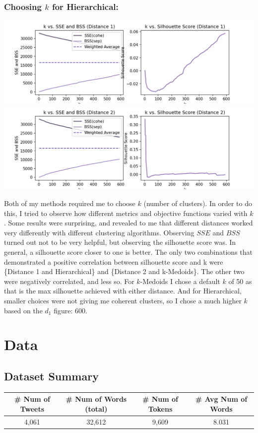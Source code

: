 \documentclass[fleqn]{article}
\begin{document}
\subsubsection{Choosing $k$ for Hierarchical:}
\begin{center}
	\includegraphics[scale=0.40]{images/d1_f_ks.png}\includegraphics[scale=0.40]{images/d2_f_ks.png}
\end{center}
Both of my methods required me to choose $k$ (number of clusters).  In order to do this, I tried to observe how different metrics and objective functions varied with $k$.  Some results were surprising, and revealed to me that different distances worked very differently with different clustering algorithms.  Observing $SSE$ and $BSS$ turned out not to be very helpful, but observing the silhouette score was.  In general, a silhouette score closer to one is better.  The only two combinations that demonstrated a positive correlation between silhouette score and k were \{Distance 1 and Hierarchical\} and \{Distance 2 and k-Medoids\}. The other two were negatively correlated, and less so.  For $k$-Medoids I chose a default $k$ of 50 as that is the max silhouette achieved with either distance.  And for Hierarchical, smaller choices were not giving me coherent clusters, so I chose a much higher $k$ based on the $d_1$ figure: 600.
\section{Data}
\subsection{Dataset Summary}
\begin{tabular}{|c|c|c|c|}
	\hline
	\textbf{\# Num of Tweets} & \textbf{\# Num of Words (total)} & \textbf{\# Num of Tokens} & \textbf{\# Avg Num of Words}\\
	\hline
	4,061&32,612&9,609&8.031\\
	\hline
\end{tabular}
\end{document}
